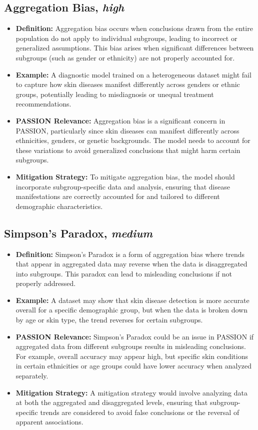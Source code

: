 \begin{refsection}
		\subsection{Aggregation Bias, \textit{high}}
		\begin{itemize}
			\item \textbf{Definition:} Aggregation bias occurs when conclusions drawn from the entire population do not apply to individual subgroups, leading to incorrect or generalized assumptions. This bias arises when significant differences between subgroups (such as gender or ethnicity) are not properly accounted for.
			\item \textbf{Example:} A diagnostic model trained on a heterogeneous dataset might fail to capture how skin diseases manifest differently across genders or ethnic groups, potentially leading to misdiagnosis or unequal treatment recommendations.
			\item \textbf{PASSION Relevance:} Aggregation bias is a significant concern in PASSION, particularly since skin diseases can manifest differently across ethnicities, genders, or genetic backgrounds. The model needs to account for these variations to avoid generalized conclusions that might harm certain subgroups.
			\item \textbf{Mitigation Strategy:} To mitigate aggregation bias, the model should incorporate subgroup-specific data and analysis, ensuring that disease manifestations are correctly accounted for and tailored to different demographic characteristics.
		\end{itemize}
		
		\subsection{Simpson's Paradox, \textit{medium}}
		\begin{itemize}
			\item \textbf{Definition:} Simpson's Paradox is a form of aggregation bias where trends that appear in aggregated data may reverse when the data is disaggregated into subgroups. This paradox can lead to misleading conclusions if not properly addressed.
			\item \textbf{Example:} A dataset may show that skin disease detection is more accurate overall for a specific demographic group, but when the data is broken down by age or skin type, the trend reverses for certain subgroups.
			\item \textbf{PASSION Relevance:} Simpson’s Paradox could be an issue in PASSION if aggregated data from different subgroups results in misleading conclusions. For example, overall accuracy may appear high, but specific skin conditions in certain ethnicities or age groups could have lower accuracy when analyzed separately.
			\item \textbf{Mitigation Strategy:} A mitigation strategy would involve analyzing data at both the aggregated and disaggregated levels, ensuring that subgroup-specific trends are considered to avoid false conclusions or the reversal of apparent associations.
		\end{itemize}
		

\end{refsection}
